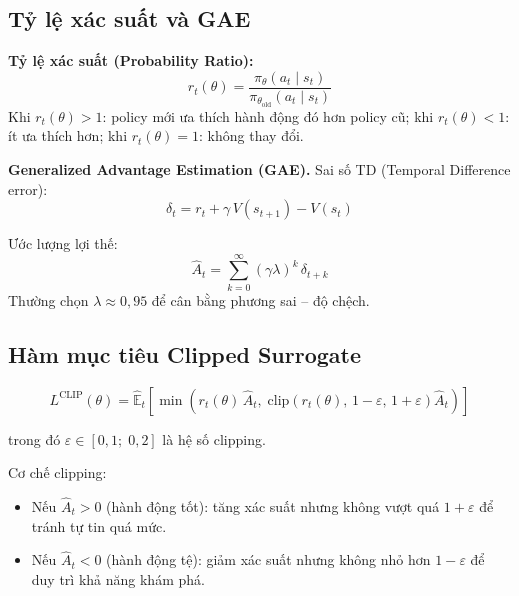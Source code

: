 \subsection{Tỷ lệ xác suất và GAE}

\textbf{Tỷ lệ xác suất (Probability Ratio):}
\begin{equation}
    r_t(\theta) = \frac{\pi_\theta(a_t \mid s_t)}{\pi_{\theta_\text{old}}(a_t \mid s_t)}
    \label{eq:prob_ratio}
\end{equation}
Khi $r_t(\theta) > 1$: policy mới ưa thích hành động đó hơn policy cũ;
khi $r_t(\theta) < 1$: ít ưa thích hơn; khi $r_t(\theta) = 1$: không thay đổi.

\textbf{Generalized Advantage Estimation (GAE).}
Sai số TD (Temporal Difference error):
\begin{equation}
    \delta_t = r_t + \gamma\, V(s_{t+1}) - V(s_t)
    \label{eq:td_error}
\end{equation}

Ước lượng lợi thế:
\begin{equation}
    \hat{A}_t = \sum_{k=0}^{\infty} (\gamma\lambda)^k\, \delta_{t+k}
    \label{eq:gae}
\end{equation}
Thường chọn $\lambda \approx 0{,}95$ để cân bằng phương sai -- độ chệch.

\subsection{Hàm mục tiêu Clipped Surrogate}

\begin{equation}
    L^{\text{CLIP}}(\theta) = \hat{\mathbb{E}}_t\!\left[
        \min\!\left(
            r_t(\theta)\,\hat{A}_t,\;
            \text{clip}\!\left(r_t(\theta),\,1{-}\varepsilon,\,1{+}\varepsilon\right)\hat{A}_t
        \right)
    \right]
    \label{eq:ppo_clip}
\end{equation}

trong đó $\varepsilon \in [0{,}1;\; 0{,}2]$ là hệ số clipping.

Cơ chế clipping:
\begin{itemize}
    \item Nếu $\hat{A}_t > 0$ (hành động tốt): tăng xác suất nhưng không vượt
    quá $1 + \varepsilon$ để tránh tự tin quá mức.
    \item Nếu $\hat{A}_t < 0$ (hành động tệ): giảm xác suất nhưng không nhỏ hơn
    $1 - \varepsilon$ để duy trì khả năng khám phá.
\end{itemize}

